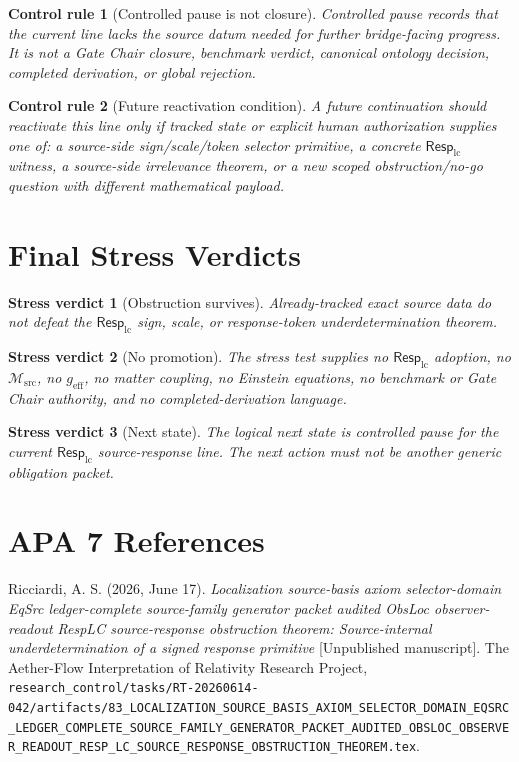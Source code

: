 \documentclass[11pt]{article}
\newcommand{\Msrc}{\mathcal{M}_{\mathrm{src}}}
\newcommand{\RespLC}{\mathsf{Resp}_{\mathrm{lc}}}
\newcommand{\geff}{g_{\mathrm{eff}}}
\newtheorem{verdict}{Stress verdict}
\newtheorem{controlrule}{Control rule}
\begin{document}
\begin{controlrule}[Controlled pause is not closure]
Controlled pause records that the current line lacks the source datum
needed for further bridge-facing progress. It is not a Gate Chair
closure, benchmark verdict, canonical ontology decision, completed
derivation, or global rejection.
\end{controlrule}

\begin{controlrule}[Future reactivation condition]
A future continuation should reactivate this line only if tracked
state or explicit human authorization supplies one of: a source-side
sign/scale/token selector primitive, a concrete \(\RespLC\) witness, a
source-side irrelevance theorem, or a new scoped obstruction/no-go
question with different mathematical payload.
\end{controlrule}

\section{Final Stress Verdicts}

\begin{verdict}[Obstruction survives]
Already-tracked exact source data do not defeat the
\(\RespLC\) sign, scale, or response-token underdetermination
theorem.
\end{verdict}

\begin{verdict}[No promotion]
The stress test supplies no \(\RespLC\) adoption, no \(\Msrc\), no
\(\geff\), no matter coupling, no Einstein equations, no benchmark or
Gate Chair authority, and no completed-derivation language.
\end{verdict}

\begin{verdict}[Next state]
The logical next state is controlled pause for the current
\(\RespLC\) source-response line. The next action must not be another
generic obligation packet.
\end{verdict}

\section*{APA 7 References}

Ricciardi, A. S. (2026, June 17). \emph{Localization source-basis
axiom selector-domain EqSrc ledger-complete source-family generator
packet audited ObsLoc observer-readout RespLC source-response
obstruction theorem: Source-internal underdetermination of a signed
response primitive} [Unpublished manuscript]. The Aether-Flow
Interpretation of Relativity Research Project,
\texttt{research\_control/tasks/RT-20260614-042/artifacts/83\_LOCALIZATION\_SOURCE\_BASIS\_AXIOM\_SELECTOR\_DOMAIN\_EQSRC\_LEDGER\_COMPLETE\_SOURCE\_FAMILY\_GENERATOR\_PACKET\_AUDITED\_OBSLOC\_OBSERVER\_READOUT\_RESP\_LC\_SOURCE\_RESPONSE\_OBSTRUCTION\_THEOREM.tex}.
\end{document}
